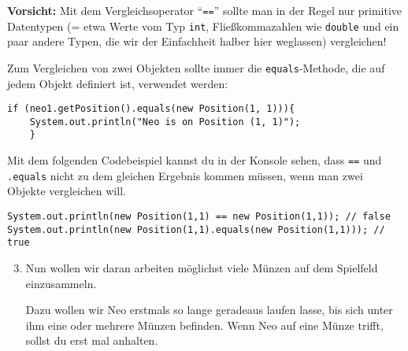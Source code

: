 \begin{Infobox}[\lstinline{==} und die \lstinline{equals()}-Methode]
	\textbf{Vorsicht:} Mit dem Vergleichsoperator \enquote{\lstinline{==}} sollte man in der Regel nur primitive Datentypen (= etwa Werte vom Typ \lstinline{int}, Fließkommazahlen wie \lstinline{double} und ein paar andere Typen, die wir der Einfachheit halber hier weglassen) vergleichen!\newline

	Zum Vergleichen von zwei Objekten sollte immer die \lstinline{equals}-Methode, die auf jedem Objekt definiert ist, verwendet werden:
	
	\begin{lstlisting}[numbers=none]
	if (neo1.getPosition().equals(new Position(1, 1))){
	System.out.println("Neo is on Position (1, 1)");
	}
	\end{lstlisting}
	
	Mit dem folgenden Codebeispiel kannst du in der Konsole sehen, dass \lstinline{==} und \lstinline{.equals} nicht zu dem gleichen Ergebnis kommen müssen, wenn man zwei Objekte vergleichen will.

	\begin{lstlisting}[numbers=none]
System.out.println(new Position(1,1) == new Position(1,1)); // false
System.out.println(new Position(1,1).equals(new Position(1,1))); // true
	\end{lstlisting}

\end{Infobox}


\begin{enumerate}\setcounter{enumi}{2}
	\item
	 	Nun wollen wir daran arbeiten möglichst viele Münzen auf dem Spielfeld einzusammeln.

		Dazu wollen wir Neo erstmals so lange geradeaus laufen lasse, bis sich unter ihm eine oder mehrere Münzen befinden.
		Wenn Neo auf eine Münze trifft, sollst du erst mal anhalten.
\end{enumerate}


